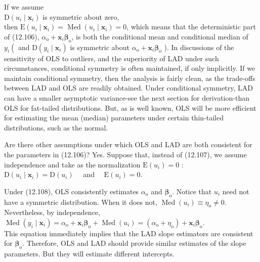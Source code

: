 \documentclass[10pt]{article}
\begin{document}
If we assume\\
$\mathrm{D}\left(u_{i} \mid \mathbf{x}_{i}\right)$ is symmetric about zero,\\
then $\mathrm{E}\left(u_{i} \mid \mathbf{x}_{i}\right)=\operatorname{Med}\left(u_{i} \mid \mathbf{x}_{i}\right)=0$, which means that the deterministic part of (12.106), $\alpha_{\mathrm{o}}+\mathbf{x}_{i} \boldsymbol{\beta}_{\mathrm{o}}$, is both the conditional mean and conditional median of $y_{i}\left(\right.$ and $\mathrm{D}\left(y_{i} \mid \mathbf{x}_{i}\right)$ is symmetric about $\alpha_{\mathrm{o}}+\mathbf{x}_{i} \boldsymbol{\beta}_{\mathrm{o}}$ ). In discussions of the sensitivity of OLS to outliers, and the superiority of LAD under such circumstances, conditional symmetry is often maintained, if only implicitly. If we maintain conditional symmetry, then the analysis is fairly clean, as the trade-offs between LAD and OLS are readily obtained. Under conditional symmetry, LAD can have a smaller asymptotic variance-see the next section for derivation-than OLS for fat-tailed distributions. But, as is well known, OLS will be more efficient for estimating the mean (median) parameters under certain thin-tailed distributions, such as the normal.

Are there other assumptions under which OLS and LAD are both consistent for the parameters in (12.106)? Yes. Suppose that, instead of (12.107), we assume independence and take as the normalization $\mathrm{E}\left(u_{i}\right)=0$ :\\
$\mathrm{D}\left(u_{i} \mid \mathbf{x}_{i}\right)=\mathrm{D}\left(u_{i}\right) \quad$ and $\quad \mathrm{E}\left(u_{i}\right)=0$.

Under (12.108), OLS consistently estimates $\alpha_{\mathrm{o}}$ and $\boldsymbol{\beta}_{\mathrm{o}}$. Notice that $u_{i}$ need not have a symmetric distribution. When it does not, $\operatorname{Med}\left(u_{i}\right) \equiv \eta_{\mathrm{o}} \neq 0$. Nevertheless, by independence,\\
$\operatorname{Med}\left(y_{i} \mid \mathbf{x}_{i}\right)=\alpha_{\mathrm{o}}+\mathbf{x}_{i} \boldsymbol{\beta}_{\mathrm{o}}+\operatorname{Med}\left(u_{i}\right)=\left(\alpha_{\mathrm{o}}+\eta_{\mathrm{o}}\right)+\mathbf{x}_{i} \boldsymbol{\beta}_{\mathrm{o}}$.\\
This equation immediately implies that the LAD slope estimators are consistent for $\boldsymbol{\beta}_{\mathrm{o}}$. Therefore, OLS and LAD should provide similar estimates of the slope parameters. But they will estimate different intercepts.
\end{document}
